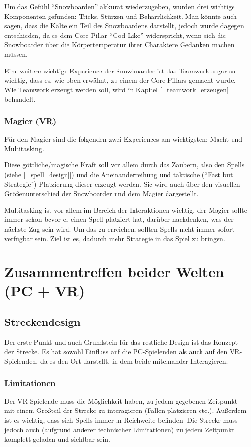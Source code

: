 Um das Gefühl "`Snowboarden"' akkurat wiederzugeben, wurden drei wichtige Komponenten gefunden: Tricks, Stürzen und Beharrlichkeit. Man könnte auch sagen, dass die Kälte ein Teil des Snowboardens darstellt, jedoch wurde dagegen entschieden, da es dem Core Pillar "`God-Like"' widerspricht, wenn sich die Snowboarder über die Körpertemperatur ihrer Charaktere Gedanken machen müssen.

Eine weitere wichtige Experience der Snowboarder ist das Teamwork sogar so wichtig, dass es, wie oben erwähnt, zu einem der Core-Pillars gemacht wurde. Wie Teamwork erzeugt werden soll, wird in Kapitel \ref{_teamwork_erzeugen} behandelt.

\subsubsection{Magier (VR)}
Für den Magier sind die folgenden zwei Experiences am wichtigsten: Macht und Multitasking. 

Diese göttliche/magische Kraft soll vor allem durch das Zaubern, also den Spells (siehe \ref{_spell_design}]) und die Aneinanderreihung und taktische ("`Fast but Strategic"') Platzierung dieser erzeugt werden. Sie wird auch über den visuellen Größenunterschied der Snowboarder und dem Magier dargestellt.

Multitasking ist vor allem im Bereich der Interaktionen wichtig, der Magier sollte immer schon bevor er einen Spell platziert hat, darüber nachdenken, was der nächste Zug sein wird. Um das zu erreichen, sollten Spells nicht immer sofort verfügbar sein. Ziel ist es, dadurch mehr Strategie in das Spiel zu bringen.

\section{Zusammentreffen beider Welten (PC + VR)}

\subsection{Streckendesign}
Der erste Punkt und auch Grundstein für das restliche Design ist das Konzept der Strecke. Es hat sowohl Einfluss auf die PC-Spielenden als auch auf den VR-Spielenden, da es den Ort darstellt, in dem beide miteinander Interagieren.

\subsubsection{Limitationen}
Der VR-Spielende muss die Möglichkeit haben, zu jedem gegebenen Zeitpunkt mit einem Großteil der Strecke zu interagieren (Fallen platzieren etc.). Außerdem ist es wichtig, dass sich Spells immer in Reichweite befinden. Die Strecke muss jedoch auch (aufgrund anderer technischer Limitationen) zu jedem Zeitpunkt komplett geladen und sichtbar sein.

